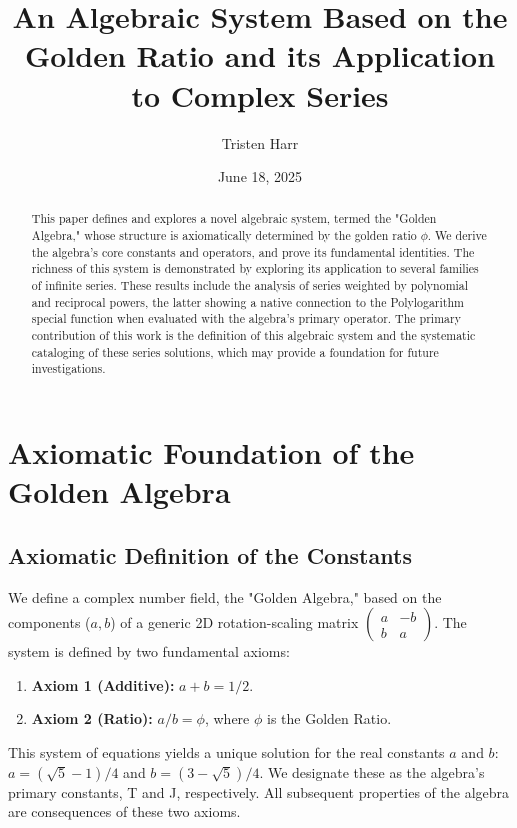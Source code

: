 \documentclass[12pt, letterpaper]{article}
\title{\textbf{An Algebraic System Based on the Golden Ratio and its Application to Complex Series}}
\author{Tristen Harr}
\affil{\textit{Saint Charles, Missouri}}
\date{June 18, 2025}
\begin{document}
\maketitle

\begin{abstract}
This paper defines and explores a novel algebraic system, termed the "Golden Algebra," whose structure is axiomatically determined by the golden ratio $\phi$. We derive the algebra's core constants and operators, and prove its fundamental identities. The richness of this system is demonstrated by exploring its application to several families of infinite series. These results include the analysis of series weighted by polynomial and reciprocal powers, the latter showing a native connection to the Polylogarithm special function when evaluated with the algebra's primary operator. The primary contribution of this work is the definition of this algebraic system and the systematic cataloging of these series solutions, which may provide a foundation for future investigations.
\end{abstract}

\section{Axiomatic Foundation of the Golden Algebra}
\subsection{Axiomatic Definition of the Constants}
We define a complex number field, the "Golden Algebra," based on the components ($a, b$) of a generic 2D rotation-scaling matrix $\begin{pmatrix} a & -b \\ b & a \end{pmatrix}$. The system is defined by two fundamental axioms:
\begin{enumerate}
    \item \textbf{Axiom 1 (Additive):} $a+b=1/2$.
    \item \textbf{Axiom 2 (Ratio):} $a/b=\phi$, where $\phi$ is the Golden Ratio.
\end{enumerate}
This system of equations yields a unique solution for the real constants $a$ and $b$: $a=(\sqrt{5}-1)/4$ and $b=(3-\sqrt{5})/4$. We designate these as the algebra's primary constants, T and J, respectively. All subsequent properties of the algebra are consequences of these two axioms.
\end{document}
